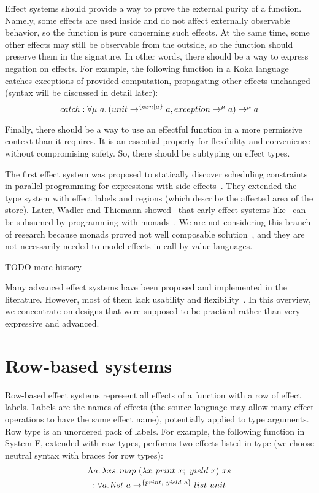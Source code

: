 \documentclass[conference]{IEEEtran}
\newcommand{\seq}{;~}
\newcommand{\ap}{~}
\begin{document}
    Effect systems should provide a way to prove the external purity of a function.
    Namely, some effects are used inside and do not affect externally observable behavior, so the function is pure concerning such effects.
    At the same time, some other effects may still be observable from the outside, so the function should preserve them in the signature.
    In other words, there should be a way to express negation on effects.
    For example, the following function in a Koka language~\cite{leijen2014koka, leijen2017type} catches exceptions of provided computation, propagating other effects unchanged (syntax will be discussed in detail later):
    \[catch : \forall \mu\ap a\ldotp (unit\to^{\{exn|\mu\}} a, exception \to^{\mu} a) \to^\mu a\]

    Finally, there should be a way to use an effectful function in a more permissive context than it requires.
    It is an essential property for flexibility and convenience without compromising safety.
    So, there should be subtyping on effect types.

    The first effect system was proposed to statically discover scheduling constraints in parallel programming for expressions with side-effects~\cite{lucassen1988polymorphic}.
    They extended the type system with effect labels and regions (which describe the affected area of the store).
    Later, Wadler and Thiemann showed~\cite{wadler2003marriage} that early effect systems like~\cite{lucassen1988polymorphic} can be subsumed by programming with monads~\cite{moggi1988computational}.
    We are not considering this branch of research because monads proved not well composable solution~\cite{liang1995monad, kiselyov2013extensible}, and they are not necessarily needed to model effects in call-by-value languages.

    TODO more history %

    Many advanced effect systems have been proposed and implemented in the literature.
    However, most of them lack usability and flexibility~\cite{odersky2022scoped}.
    In this overview, we concentrate on designs that were supposed to be practical rather than very expressive and advanced.


    \section{Row-based systems} \label{sec:rows}

    Row-based effect systems represent all effects of a function with a row of effect labels.
    Labels are the names of effects (the source language may allow many effect operations to have the same effect name), potentially applied to type arguments.
    Row type is an unordered pack of labels.
    For example, the following function in System F, extended with row types, performs two effects listed in type (we choose neutral syntax with braces for row types):
    \begin{multline*}
        \Lambda a\ldotp\lambda xs\ldotp map \ap (\lambda x\ldotp print\ap x\seq yield\ap x) \ap xs \\ : \forall a \ldotp list\ap a \to^{\{print, ~yield \ap a\}} list \ap unit
    \end{multline*}
\end{document}
